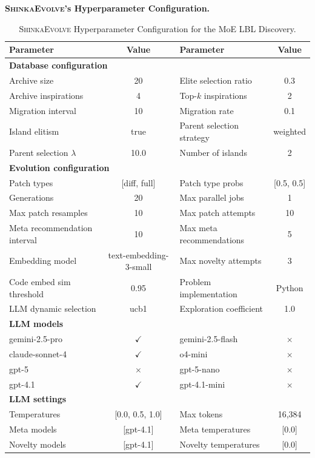 \documentclass[11pt, a4paper]{include/gdm_format}
\newcommand{\ouralgo}{\textsc{ShinkaEvolve}\xspace}
\begin{document}
{\clearpage
\textbf{\ouralgo's Hyperparameter Configuration.}
\begin{table}[h]
\centering
\small
\begin{tabular}{lclc}
\toprule
\textbf{Parameter} & \textbf{Value} & \textbf{Parameter} & \textbf{Value} \\
\midrule
\multicolumn{4}{l}{\textbf{Database configuration}} \\
\midrule
Archive size & 20 & Elite selection ratio & 0.3 \\
Archive inspirations & 4 & Top-$k$ inspirations & 2 \\
Migration interval & 10 & Migration rate & 0.1 \\
Island elitism & true & Parent selection strategy & weighted \\
Parent selection $\lambda$ & 10.0 & Number of islands & 2 \\
\midrule
\multicolumn{4}{l}{\textbf{Evolution configuration}} \\
\midrule
Patch types & [diff, full] & Patch type probs & [0.5, 0.5] \\
Generations & 20 & Max parallel jobs & 1 \\
Max patch resamples & 10 & Max patch attempts & 10 \\
Meta recommendation interval & 10 & Max meta recommendations & 5 \\
Embedding model & text-embedding-3-small & Max novelty attempts & 3 \\
Code embed sim threshold & 0.95 & Problem implementation & Python \\
LLM dynamic selection & ucb1 & Exploration coefficient & 1.0 \\
\midrule
\multicolumn{4}{l}{\textbf{LLM models}} \\
\midrule
gemini-2.5-pro & $\checkmark$ & gemini-2.5-flash & $\times$ \\
claude-sonnet-4 & $\checkmark$ & o4-mini & $\times$ \\
gpt-5 & $\times$ & gpt-5-nano & $\times$ \\
gpt-4.1 & $\checkmark$ & gpt-4.1-mini & $\times$ \\
\midrule
\multicolumn{4}{l}{\textbf{LLM settings}} \\
\midrule
Temperatures & [0.0, 0.5, 1.0] & Max tokens & 16{,}384 \\
Meta models & [gpt-4.1] & Meta temperatures & [0.0] \\
Novelty models & [gpt-4.1] & Novelty temperatures & [0.0] \\
\bottomrule
\end{tabular}
  \caption{\ouralgo Hyperparameter Configuration for the MoE LBL Discovery.}
  \label{tab:hyperparams_moe}
\end{table}


}
\end{document}
